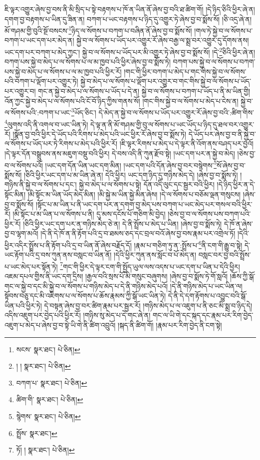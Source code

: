 ཇི་ལྟར་འགྱུར་ཞེས་བྱ་བས་ནི་མི་སྲིད་པ་སྟེ་བརྟགས་པ་ཁོ་ན་ཡིན་ནོ་ཞེས་བྱ་བའི་ཐ་ཚིག་གོ། །དེ་ཉིད་ཅིའི་ཕྱིར་ཞེ་ན། དགག་བྱ་བརྟགས་པ་ཡིན་དུ་ཟིན་ན། བཀག་པ་ཡང་བརྟགས་པ་ཉིད་དུ་འགྱུར་ཏེ་ཞེས་བྱ་བ་སྨོས་སོ། །ཅི་འདྲ་ཞེ་ན། མོ་གཤམ་གྱི་བུའི་སྔོ་བསངས་\footnote{སངས་  སྣར་ཐང་།  པེ་ཅིན། }ཉིད་ལ་སོགས་པ་བཀག་པ་བཞིན་ནོ་ཞེས་བྱ་བ་སྨོས་སོ། །གལ་ཏེ་སྐྱེ་བ་ལ་སོགས་པ་བཀག་པ་ཡང་དག་པར་མེད་ན། སྐྱེ་བ་ལ་སོགས་པ་ཡོད་པར་འགྱུར་རོ་ཞེས་བརྒྱ་ལ་སྨྲ་བར་འགྱུར་དུ་དོགས་ནས། ཡང་དག་པར་བཀག་པ་མེད་ཀྱང་། སྐྱེ་བ་ལ་སོགས་པ་ཡོད་པར་མི་འགྱུར་ཏེ་ཞེས་བྱ་བ་སྨོས་སོ། །དེ་\footnote{། །  སྣར་ཐང་།  པེ་ཅིན། }ཅིའི་ཕྱིར་ཞེ་ན། བཀག་པས་སྐྱེ་བ་མེད་པ་ལ་སོགས་པ་ལ་མ་ཁྱབ་པའི་ཕྱིར་ཞེས་བྱ་བ་སྨོས་ཏེ། བཀག་པས་སྐྱེ་བ་ལ་སོགས་པ་བཀག་པས་སྐྱེ་བ་མེད་པ་ལ་སོགས་པ་ལ་མ་ཁྱབ་པའི་ཕྱིར་རོ། །གང་གི་ཕྱིར་བཀག་པ་མེད་པ་གང་གིས་སྐྱེ་བ་ལ་སོགས་པའི་བཀག་པ་ལྡོག་པར་འགྱུར་ཏེ། སྐྱེ་བ་མེད་པ་ལ་སོགས་པ་ལྡོག་པར་འགྱུར་བ་གང་གིས་སྐྱེ་བ་ལ་སོགས་པ་ཡོད་པར་འགྱུར་བ། གང་ན་སྐྱེ་བ་མེད་པ་ལ་སོགས་པ་ཡོད་པ་དེ་ན། སྐྱེ་བ་ལ་སོགས་པ་བཀག་པ་ཡོད་པ་ནི་མ་ཡིན་གྱི། འོན་ཀྱང་སྐྱེ་བ་མེད་པ་ལ་སོགས་པའི་ངོ་བོ་ཉིད་ཀྱིས་གནས་སོ། །གང་གིས་སྐྱེ་བ་ལ་སོགས་པ་མེད་པ་ངེས་ན། སྐྱེ་བ་ལ་སོགས་པའི་:བཀག་པ་ཡང་\footnote{བཀག་པ་  སྣར་ཐང་།  པེ་ཅིན། }ཡོད་ཅིང་། དེ་མེད་ན་སྐྱེ་བ་ལ་སོགས་པ་ཡོད་པར་འགྱུར་རོ་ཞེས་བྱ་བའི་:ཚིག་གིས་\footnote{ཚིག་གི་  སྣར་ཐང་།  པེ་ཅིན། }ལུགས་འདི་ནི་འགལ་བ་ཡང་ཡིན་ཏེ། དེ་ལྟ་ན་ནི་མོ་གཤམ་གྱི་བུ་ལ་སོགས་པ་ཡང་ཡོད་པ་ཉིད་དུ་ཐལ་བར་འགྱུར་རོ། །སྣོན་བྱ་བའི་ཕྱིར་དེ་ཡོད་པའི་རིགས་པ་མེད་པའི་ཡང་ཕྱིར་རོ་ཞེས་བྱ་བ་སྨོས་ཏེ། དེ་ཡོད་པར་ཞེས་བྱ་བ་ནི་སྐྱེ་བ་ལ་སོགས་པ་ཡོད་པར་ཏེ་རིགས་པ་མེད་པའི་ཕྱིར་རོ། །ཇི་ལྟར་རིགས་པ་མེད་པ་དེ་ལྟར་ནི་འོག་ནས་བཤད་པར་བྱའོ། །དེ་ལྟར་དོན་བསྒྲུབས་ནས་མཇུག་བསྡུ་བའི་ཕྱིར། དེ་བས་འདི་ནི་ཀུན་རྫོབ་སྟེ། །ཡང་དག་པར་ན་སྐྱེ་བ་མེད། །ཅེས་བྱ་བ་ལ་སོགས་པའོ། །ཡང་དག་དོན་ཡིན་ཡང་དག་མིན། །ཡང་དག་པའི་དོན་ཞེས་བྱ་བར་བསྙེགས་\footnote{སྙེགས་  སྣར་ཐང་།  པེ་ཅིན། }སོ་ཞེས་བྱ་བ་སྨོས་སོ། །ཅིའི་ཕྱིར་ཡང་དག་པ་མ་ཡིན་ཞེ་ན། དེའི་ཕྱིར། ཡང་དག་ཉིད་དུ་གཉིས་མེད་དེ། །ཞེས་བྱ་བ་སྨོས་ཏེ། །གཉིས་ནི་སྐྱེ་བ་ལ་སོགས་པ་དང་། སྐྱེ་བ་མེད་པ་ལ་སོགས་པ་སྟེ། དོན་འདི་ལུང་དང་སྦྱར་བའི་ཕྱིར། །དེ་ཉིད་ཕྱིར་ན་དེ་སྟོང་མིན། །མི་སྟོང་མ་ཡིན་ཡོད་མེད་མིན། །མི་སྐྱེ་མ་ཡིན་སྐྱེ་མིན་ཞེས། །དེ་ལ་སོགས་པ་བཅོམ་ལྡན་གསུངས། །ཞེས་བྱ་བ་སྨོས་སོ། །སྟོང་པ་མ་ཡིན་པ་ནི་ཡང་དག་པར་ན་དགག་བྱ་མེད་པས་བཀག་པ་ཡང་མེད་པར་གསལ་བའི་ཕྱིར་རོ། །མི་སྟོང་པ་མ་ཡིན་པ་ལ་སོགས་པ་ནི། དུ་མས་དངོས་པོ་གཅིག་མི་བྱེད། །ཅེས་བྱ་བ་ལ་སོགས་པས་བཀག་པའི་ཕྱིར་རོ། །ཅིའི་ཕྱིར་ཡང་དག་པར་ན་གཉིས་མེད་ཅེ་ན། དེ་ནི་སྤྲོས་པ་མེད་པ་ཡིན། །ཞེས་བྱ་བ་སྨོས་ཏེ། དེ་ཁོ་ན་ཞེས་བྱ་བ་ལྷག་མའོ། །དེ་ནི་དེ་ཁོ་ན་ནི་རྟོག་པའི་དྲ་བ་ཐམས་ཅད་དང་བྲལ་བའོ་ཞེས་བྱ་བས་རྣམ་པར་འགྲེལ་ཏོ། །དེའི་ཕྱིར་འདིར་སྤྲོས་པ་ནི་རྟོག་པའི་དྲ་བ་ཡིན་ནོ་ཞེས་བརྗོད་དོ། །རྣམ་པ་གཅིག་ཏུ་ན་:སྤྲོས་པ་\footnote{སྤྲོས་  སྣར་ཐང་། }ནི་ངག་གི་རྒྱུ་བ་སྟེ། དེ་ཡང་རྟོག་པའི་དྲ་བས་ཀུན་ནས་བསླང་བ་ཡིན་ནོ། །དེའི་ཕྱིར་ཀུན་ནས་སློང་བ་པོ་མེད་ན། བསླང་བར་བྱ་བའི་སྤྲོས་པ་ཡང་མེད་པར་སྟོན་ཏེ། \footnote{ཏོ། །   སྣར་ཐང་།  པེ་ཅིན། }གང་གི་ཕྱིར་དེ་ལྟར་ངག་གི་སྤྱོད་ཡུལ་ལས་འདས་པ་ཡང་དག་པ་ཡིན་པ་དེའི་ཕྱིར། འཇམ་དཔལ་གྱིས་ནི་ཡང་དག་དྲིས། །རྒྱལ་བའི་སྲས་པོ་མི་གསུང་བཞུགས། །ཞེས་བྱ་བ་སྨོས་ཏེ་གོ་སླའོ། །ཆོས་ཀྱི་སྒོ་གང་ལ་སྐྱེ་བ་དང་མི་སྐྱེ་བ་ལ་སོགས་པ་གཉིས་མེད་པ་དེ་ནི་གཉིས་མེད་པའོ། །དེ་ནི་གཉིས་མེད་པ་ཡང་ཡིན་ལ། སྟོབས་བཅུ་དང་མི་འཇིགས་པ་ལ་སོགས་པ་ཆོས་རྣམས་ཀྱི་སྒོ་ཡང་ཡིན་ཏེ། དེ་ནི་དེ་དག་རྟོགས་པ་འབྱུང་བའི་སྒོ་ཡིན་པའི་ཕྱིར་ཏེ། དེ་བསྟན་ཞེས་བྱ་བར་ཚིག་རྣམ་པར་སྦྱར་རོ། །གཉིས་མེད་པ་ལ་འཇུག་པ་ནི་ཅང་མི་སྨྲ་བ་ཉིད་དེ། འདིས་འཇུག་པར་བྱེད་པའི་ཕྱིར་རོ། །གཉིས་སུ་མེད་པ་དེ་གང་ཞེ་ན། གང་ལ་ཡི་གེ་དང་སྐད་དང་རྣམ་པར་རིག་བྱེད་འཇུག་པ་མེད་པ་ཞེས་བྱ་བ་སྟེ་ཡི་གེ་ནི་ཚིག་འབྲུའོ། །སྐད་ནི་ཚིག་གོ། །རྣམ་པར་རིག་བྱེད་ནི་ངག་སྟེ། 